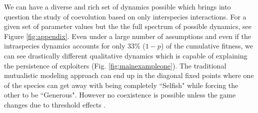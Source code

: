 \documentclass[12pt]{article}
\begin{document}
We can have a diverse and rich set of dynamics possible which brings into question the study of coevolution based on only interspecies interactions. 
For a given set of parameter values but the the full spectrum of possible dynamics, see Figure \ref{fig:appendix}.
Even under a large number of assumptions and even if the intraspecies dynamics accounts for only $33\%$ ($1-p$) of the cumulative fitness, we can see drastically different qualitative dynamics which is capable of explaining the persistence of exploiters (Fig. \ref{fig:mainexampleone}).
The traditional mutualistic modeling approach can end up in the diagonal fixed points where one of the species can get away with being completely ``Selfish" while forcing the other to be ``Generous".
However no coexistence is possible unless the game changes due to threshold effects \citep{gokhale:PRSB:2012}.
\end{document}
